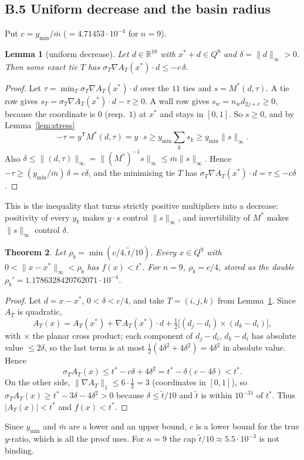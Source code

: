 \documentclass[11pt]{amsart}
\newtheorem{theorem}{Theorem}[section]
\newtheorem{lemma}[theorem]{Lemma}
\theoremstyle{definition}
\newcommand{\R}{\mathbb{R}}
\newcommand{\tstar}{t^{*}}
\begin{document}
\subsection*{B.5 Uniform decrease and the basin radius}
Put $c = y_{\min}/\bar m$ ($= 4.71453\cdot10^{-4}$ for $n = 9$).
\begin{lemma}[uniform decrease]\label{lem:decrease}
Let $d \in \R^{18}$ with $x^* + d \in Q^9$ and $\delta = \|d\|_\infty > 0$. Then some exact tie $T$ has $\sigma_T\nabla A_T(x^*)\cdot d \le -c\,\delta$.
\end{lemma}
\begin{proof}
Let $\tau = \min_T \sigma_T\nabla A_T(x^*)\cdot d$ over the $11$ ties and $s = M^*(d,\tau)$. A tie row gives $s_T = \sigma_T\nabla A_T(x^*)\cdot d - \tau \ge 0$. A wall row gives $s_w = n_w d_{2j+c} \ge 0$, because the coordinate is $0$ (resp.\ $1$) at $x^*$ and stays in $[0,1]$. So $s \ge 0$, and by Lemma~\ref{lem:stress}
\[
 -\tau = y^{\mathsf T}M^*(d,\tau) = y\cdot s \ge y_{\min}\sum_k s_k \ge y_{\min}\|s\|_\infty .
\]
Also $\delta \le \|(d,\tau)\|_\infty = \|(M^*)^{-1}s\|_\infty \le \bar m\|s\|_\infty$. Hence $-\tau \ge (y_{\min}/\bar m)\,\delta = c\delta$, and the minimising tie $T$ has $\sigma_T\nabla A_T(x^*)\cdot d = \tau \le -c\delta$.
\end{proof}
This is the inequality that turns strictly positive multipliers into a decrease: positivity of every $y_k$ makes $y\cdot s$ control $\|s\|_\infty$, and invertibility of $M^*$ makes $\|s\|_\infty$ control $\delta$.

\begin{theorem}\label{thm:basin}
Let $\rho_b = \min(c/4, \tilde t/10)$. Every $x \in Q^9$ with $0 < \|x - x^*\|_\infty < \rho_b$ has $f(x) < \tstar$. For $n = 9$, $\rho_b = c/4$, stored as the double $\rho_b' = 1.1786328420762071\cdot10^{-4}$.
\end{theorem}
\begin{proof}
Let $d = x - x^*$, $0 < \delta < c/4$, and take $T = (i,j,k)$ from Lemma~\ref{lem:decrease}. Since $A_T$ is quadratic,
\[
 A_T(x) = A_T(x^*) + \nabla A_T(x^*)\cdot d + \tfrac12\bigl[(d_j - d_i)\times(d_k - d_i)\bigr],
\]
with $\times$ the planar cross product; each component of $d_j - d_i$, $d_k - d_i$ has absolute value $\le 2\delta$, so the last term is at most $\tfrac12(4\delta^2 + 4\delta^2) = 4\delta^2$ in absolute value. Hence
\[
 \sigma_TA_T(x) \le \tstar - c\delta + 4\delta^2 = \tstar - \delta(c - 4\delta) < \tstar .
\]
On the other side, $\|\nabla A_T\|_1 \le 6\cdot\frac12 = 3$ (coordinates in $[0,1]$), so $\sigma_TA_T(x) \ge \tstar - 3\delta - 4\delta^2 > 0$ because $\delta \le \tilde t/10$ and $\tilde t$ is within $10^{-31}$ of $\tstar$. Thus $\lvert A_T(x)\rvert < \tstar$ and $f(x) < \tstar$.
\end{proof}
Since $y_{\min}$ and $\bar m$ are a lower and an upper bound, $c$ is a lower bound for the true $y$-ratio, which is all the proof uses. For $n = 9$ the cap $\tilde t/10 \approx 5.5\cdot10^{-3}$ is not binding.
\end{document}
